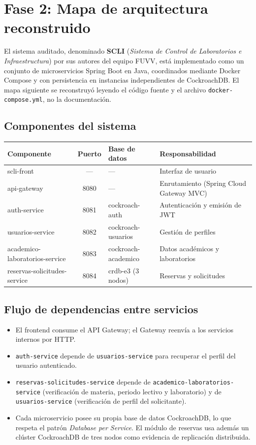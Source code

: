 \documentclass[11pt,a4paper]{article}
\begin{document}
\section{Fase 2: Mapa de arquitectura reconstruido}

El sistema auditado, denominado \textbf{SCLI} (\emph{Sistema de Control de
Laboratorios e Infraestructura}) por sus autores del equipo FUVV, está
implementado como un conjunto de microservicios Spring Boot en Java,
coordinados mediante Docker Compose y con persistencia en instancias
independientes de CockroachDB. El mapa siguiente se reconstruyó leyendo el
código fuente y el archivo \texttt{docker-compose.yml}, no la documentación.

\subsection{Componentes del sistema}

\begin{center}
\begin{tabular}{l c l l}
\toprule
\textbf{Componente} & \textbf{Puerto} & \textbf{Base de datos} & \textbf{Responsabilidad} \\
\midrule
scli-front & --- & --- & Interfaz de usuario \\
api-gateway & 8080 & --- & Enrutamiento (Spring Cloud Gateway MVC) \\
auth-service & 8081 & cockroach-auth & Autenticación y emisión de JWT \\
usuarios-service & 8082 & cockroach-usuarios & Gestión de perfiles \\
academico-laboratorios-service & 8083 & cockroach-academico & Datos académicos y laboratorios \\
reservas-solicitudes-service & 8084 & crdb-e3 (3 nodos) & Reservas y solicitudes \\
\bottomrule
\end{tabular}
\end{center}

\subsection{Flujo de dependencias entre servicios}

\begin{itemize}
  \item El frontend consume el API Gateway; el Gateway reenvía a los servicios
        internos por HTTP.
  \item \texttt{auth-service} depende de \texttt{usuarios-service} para
        recuperar el perfil del usuario autenticado.
  \item \texttt{reservas-solicitudes-service} depende de
        \texttt{academico-laboratorios-service} (verificación de materia,
        periodo lectivo y laboratorio) y de \texttt{usuarios-service}
        (verificación de perfil del solicitante).
  \item Cada microservicio posee su propia base de datos CockroachDB, lo que
        respeta el patrón \emph{Database per Service}. El módulo de reservas
        usa además un clúster CockroachDB de tres nodos como evidencia de
        replicación distribuida.
\end{itemize}
\end{document}
